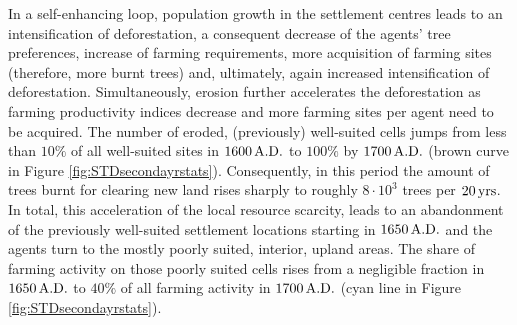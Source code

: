 In a self-enhancing loop, population growth in the settlement centres leads to an intensification of deforestation, a consequent decrease of the agents' tree preferences, increase of farming requirements, more acquisition of farming sites (therefore, more burnt trees) and, ultimately, again increased intensification of deforestation.
Simultaneously, erosion further accelerates the deforestation as farming productivity indices decrease and more farming sites per agent need to be acquired.
The number of eroded, (previously) well-suited cells jumps from less than $10\%$ of all well-suited sites in $1600\,{\rm A.D.}$ to $100\%$ by $1700\, {\rm A.D.}$ (brown curve in Figure \ref{fig:STDsecondayrstats}).
Consequently, in this period the amount of trees burnt for clearing new land rises sharply to roughly $8\cdot 10^3$ trees per $20 \, {\rm yrs}$.
In total, this acceleration of the local resource scarcity, leads to an abandonment of the previously well-suited settlement locations starting in $1650\,{\rm A.D.}$ and the agents turn to the mostly poorly suited, interior, upland areas.
The share of farming activity on those poorly suited cells rises from a negligible fraction in $1650\, {\rm A.D.}$ to $40\%$ of all farming activity in $1700\,{\rm A.D.}$ (cyan line in Figure \ref{fig:STDsecondayrstats}).


